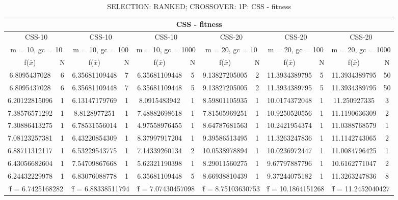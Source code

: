 \begin{table}[H]
	\centering
	\caption{SELECTION: RANKED; CROSSOVER: 1P: CSS - fitness}
	\begin{adjustbox}{width=1\textwidth}
		\begin{tabular}{ |c|c||c|c||c|c||c|c||c|c||c|c| }
			\hline
			\multicolumn{12}{|c|}{CSS - fitness} \\
			\hline
			\multicolumn{2}{|c||}{CSS-10} & \multicolumn{2}{c||}{CSS-10} & \multicolumn{2}{c||}{CSS-10} & \multicolumn{2}{c||}{CSS-20} & \multicolumn{2}{c||}{CSS-20} & \multicolumn{2}{c|}{CSS-20}\\
			\hline
			\multicolumn{2}{|c||}{m = 10, gc = 10} & \multicolumn{2}{c||}{m = 10, gc = 100} & \multicolumn{2}{c||}{m = 10, gc = 1000} & \multicolumn{2}{c||}{m = 20, gc = 10} & \multicolumn{2}{c||}{m = 20, gc = 100} & \multicolumn{2}{c|}{m = 20, gc = 1000}\\
			\hline
			f($\bar{x}$) & N & f($\bar{x}$) & N & f($\bar{x}$) & N & f($\bar{x}$) & N & f($\bar{x}$) & N & f($\bar{x}$) & N\\
			\hline
			\hline
			6.8095437028 & 6 & 6.35681109448 & 7 & 6.35681109448 & 5 & 9.13827205005 & 2 & 11.3934389795 & 5 & 11.3934389795 & 50\\
			\hline
			6.8095437028 & 6 & 6.35681109448 & 7 & 6.35681109448 & 5 & 9.13827205005 & 2 & 11.3934389795 & 5 & 11.3934389795 & 50\\
			6.20122815096 & 1 & 6.13147179769 & 1 & 8.0915483942 & 1 & 8.59801105935 & 1 & 10.0174372048 & 1 & 11.250927335 & 3\\
			7.38576571292 & 1 & 8.8128977251 & 1 & 7.48882698618 & 1 & 7.81505969251 & 1 & 10.9250520556 & 1 & 11.1190636309 & 2\\
			7.30886413275 & 1 & 6.78531556014 & 1 & 4.97558976455 & 1 & 8.64787681563 & 1 & 10.2421954374 & 1 & 11.0388768579 & 1\\
			7.08123257381 & 1 & 6.43220854309 & 1 & 8.37997917204 & 1 & 9.39586513495 & 1 & 11.3263247836 & 1 & 11.1142743065 & 2\\
			6.88711312117 & 1 & 6.53229543775 & 1 & 7.14339260134 & 2 & 10.0538978894 & 1 & 10.0236972447 & 1 & 11.0084796425 & 1\\
			6.43056682604 & 1 & 7.54709867668 & 1 & 5.62321190398 & 1 & 8.29011560275 & 1 & 9.67797887796 & 1 & 10.6162771047 & 2\\
			6.24432229978 & 1 & 6.83076088778 & 1 & 6.35681109448 & 5 & 8.66938810439 & 1 & 9.37244075182 & 1 & 11.3263247836 & 8\\
			\hline
			\multicolumn{2}{|c||}{\^{f} = 6.7425168282} & \multicolumn{2}{c||}{\^{f} = 6.88338511794} & \multicolumn{2}{c||}{\^{f} = 7.07430457098} & \multicolumn{2}{c||}{\^{f} = 8.75103630753} & \multicolumn{2}{c||}{\^{f} = 10.1864151268} & \multicolumn{2}{c|}{\^{f} = 11.2452040427}\\
			\hline
		\end{tabular}
	\end{adjustbox}
\end{table}
